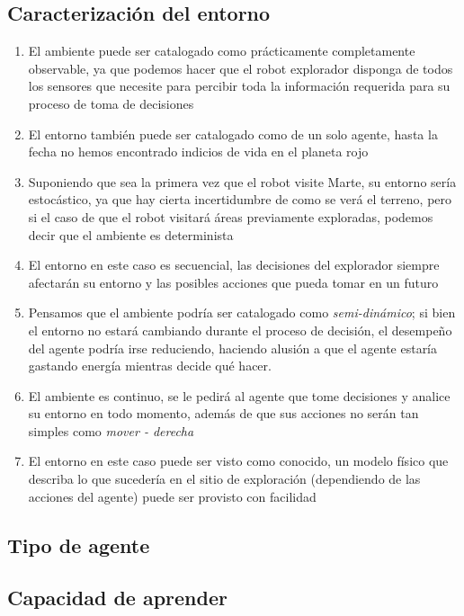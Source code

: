 \documentclass{article}
\begin{document}
        \subsection{Caracterización del entorno}
            \begin{enumerate}
                \item El ambiente puede ser catalogado como prácticamente completamente observable, ya que podemos hacer que el robot explorador disponga de todos los sensores que necesite para percibir toda la información requerida para su proceso de toma de decisiones
                \item El entorno también puede ser catalogado como de un solo agente, hasta la fecha no hemos encontrado indicios de vida en el planeta rojo
                \item Suponiendo que sea la primera vez que el robot visite Marte, su entorno sería estocástico, ya que hay cierta incertidumbre de como se verá el terreno, pero si el caso de que el robot visitará áreas previamente exploradas, podemos decir que el ambiente es determinista
                \item El entorno en este caso es secuencial, las decisiones del explorador siempre afectarán su entorno y las posibles acciones que pueda tomar en un futuro
                \item Pensamos que el ambiente podría ser catalogado como \emph{semi-dinámico}; si bien el entorno no estará cambiando durante el proceso de decisión, el desempeño del agente podría irse reduciendo, haciendo alusión a que el agente estaría gastando energía mientras decide qué hacer.
                \item El ambiente es continuo, se le pedirá al agente que tome decisiones y analice su entorno en todo momento, además de que sus acciones no serán tan simples como \emph{mover - derecha}
                \item El entorno en este caso puede ser visto como conocido, un modelo físico que describa lo que sucedería en el sitio de exploración (dependiendo de las acciones del agente) puede ser provisto con facilidad
            \end{enumerate}

        \subsection{Tipo de agente}

        \subsection{Capacidad de aprender}
\end{document}
